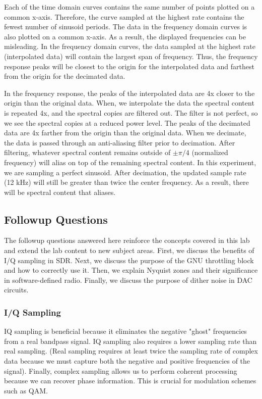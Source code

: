 \documentclass{article}
\begin{document}
Each of the time domain curves contains the same number of points plotted on a common x-axis. Therefore, the curve sampled at the highest rate contains the fewest number of sinusoid periods. The data in the frequency domain curves is also plotted on a common x-axis. As a result, the displayed frequencies can be misleading. In the frequency domain curves, the data sampled at the highest rate (interpolated data) will contain the largest span of frequency. Thus, the frequency response peaks will be closest to the origin for the interpolated data and farthest from the origin for the decimated data. 

In the frequency response, the peaks of the interpolated data are 4x closer to the origin than the original data. When, we interpolate the data the spectral content is repeated 4x, and the spectral copies are filtered out. The filter is not perfect, so we see the spectral copies at a reduced power level. The peaks of the decimated data are 4x farther from the origin than the original data. When we decimate, the data is passed through an anti-aliasing filter prior to decimation. After filtering, whatever spectral content remains outside of $\pm\pi/4$ (normalized frequency) will alias on top of the remaining spectral content. In this experiment, we are sampling a perfect sinusoid. After decimation, the updated sample rate (12 kHz) will still be greater than twice the center frequency. As a result, there will be spectral content that aliases.

\subsection{Followup Questions}

The followup questions answered here reinforce the concepts covered in this lab and extend the lab content to new subject areas. First, we discuss the benefits of I/Q sampling in SDR. Next, we discuss the purpose of the GNU throttling block and how to correctly use it. Then, we explain Nyquist zones and their significance in software-defined radio. Finally, we discuss the purpose of dither noise in DAC circuits.



	\subsubsection{I/Q Sampling}
	IQ sampling is beneficial because it eliminates the negative "ghost" frequencies from a real bandpass signal. IQ sampling also requires a lower sampling rate than real sampling. (Real sampling requires at least twice the sampling rate of complex data because we must capture both the negative and positive frequencies of the signal). Finally, complex sampling allows us to perform coherent processing because we can recover phase information. This is crucial for modulation schemes such as QAM.
	
\end{document}
